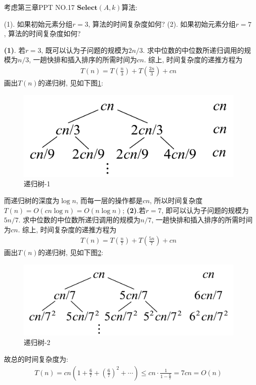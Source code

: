 \documentclass{article}
\begin{document}
\pagebreak

\begin{homeworkProblem}
	考虑第三章PPT NO.17 $\textbf{Select}(A,k)$算法: 

	(1). 如果初始元素分组$r=3$, 算法的时间复杂度如何?
	(2). 如果初始元素分组$r=7$, 算法的时间复杂度如何?


	\solution
	

	\textbf{(1)}. 若$r=3$, 既可以认为子问题的规模为$2n/3$. 求中位数的中位数所递归调用的规模为$n/3$, 一趟快排和插入排序的所需时间为$cn$. 综上, 时间复杂度的递推方程为
	\begin{align}
		T\left( n \right) =T\left( \frac{n}{3} \right) +T\left( \frac{2n}{3} \right) +cn
	\end{align}
	画出$T(n)$的递归树, 见如下图\ref{fig:递归树-1}:
	\begin{figure}[H]  %
		\centering
		\includegraphics[width=0.4\linewidth]{images/title/递归树1.pdf}
		\caption{递归树-1}
		\label{fig:递归树-1}
	\end{figure}
	而递归树的深度为$\log n$, 而每一层的操作都是$cn$, 所以时间复杂度$T(n)=O(cn\log n)=O(n\log n)$;
	\textbf{(2)}.若$r=7$, 即可以认为子问题的规模为$5n/7$. 求中位数的中位数所递归调用的规模为$n/7$, 一趟快排和插入排序的所需时间为$cn$. 综上, 时间复杂度的递推方程为
	\begin{align}
		T\left( n \right) =T\left( \frac{n}{7} \right) +T\left( \frac{5n}{7} \right) +cn
	\end{align}
	画出$T(n)$的递归树, 见如下图\ref{fig:递归树-2}:
	\begin{figure}[H]  %
		\centering
		\includegraphics[width=0.4\linewidth]{images/title/递归树2.pdf}
		\caption{递归树-2}
		\label{fig:递归树-2}
	\end{figure}
	故总的时间复杂度为:
	\begin{align}
		T\left( n \right) =cn\left( 1+\frac{6}{7}+\left( \frac{6}{7} \right) ^2+\cdots \right) \le cn\cdot \frac{1}{1-\frac{6}{7}}=7cn=O\left( n \right) 
	\end{align}
\end{homeworkProblem}
\end{document}
